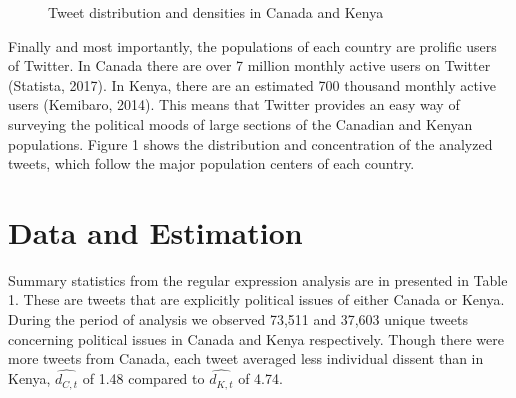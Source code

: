 \documentclass[12pt]{article}
\begin{document}
\begin{spacing}{1.5}
\begin{figure}[htb]
\centering 
{}
\caption{Tweet distribution and densities in Canada and Kenya}
\end{figure}

Finally and most importantly, the populations of each country are prolific users of Twitter. In Canada there are over 7 million monthly active users on Twitter (Statista, 2017). In Kenya, there are an estimated 700 thousand monthly active users (Kemibaro, 2014). This means that Twitter provides an easy way of surveying the political moods of large sections of the Canadian and Kenyan populations. Figure 1 shows the distribution and concentration of the analyzed tweets, which follow the major population centers of each country. 







\section*{Data and Estimation}   

Summary statistics from the regular expression analysis are in presented in Table 1. These are tweets that are explicitly political issues of either Canada or Kenya. During the period of analysis we observed 73,511 and 37,603 unique tweets concerning political issues in Canada and Kenya respectively. Though there were more tweets from Canada, each tweet averaged less individual dissent than in Kenya, $\hat{d_{C,t}}$ of 1.48 compared to $\hat{d_{K,t}}$ of 4.74.  


\end{spacing}
\end{document}
